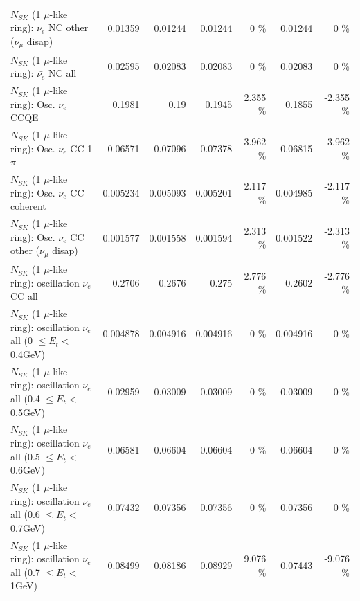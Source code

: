 \begin{table}
\begin{tabular}{| l | r | r | r  r | r  r |}
          $N_{SK}$ (1 $\mu$-like ring): $\bar{\nu_e}$ NC other ($\nu_\mu$ disap) &         0.01359 &         0.01244 &         0.01244 &        0 \%  &         0.01244 &        0 \%  \\ 
                            $N_{SK}$ (1 $\mu$-like ring): $\bar{\nu_{e}}$ NC all &         0.02595 &         0.02083 &         0.02083 &        0 \%  &         0.02083 &        0 \%  \\ 
\hline
\hline
\hline
                                 $N_{SK}$ (1 $\mu$-like ring): Osc. $\nu_e$ CCQE &          0.1981 &            0.19 &          0.1945 &    2.355 \%  &          0.1855 &   -2.355 \%  \\ 
                            $N_{SK}$ (1 $\mu$-like ring): Osc. $\nu_e$ CC 1$\pi$ &         0.06571 &         0.07096 &         0.07378 &    3.962 \%  &         0.06815 &   -3.962 \%  \\ 
                          $N_{SK}$ (1 $\mu$-like ring): Osc. $\nu_e$ CC coherent &        0.005234 &        0.005093 &        0.005201 &    2.117 \%  &        0.004985 &   -2.117 \%  \\ 
           $N_{SK}$ (1 $\mu$-like ring): Osc. $\nu_e$ CC other ($\nu_\mu$ disap) &        0.001577 &        0.001558 &        0.001594 &    2.313 \%  &        0.001522 &   -2.313 \%  \\ 
                        $N_{SK}$ (1 $\mu$-like ring): oscillation $\nu_e$ CC all &          0.2706 &          0.2676 &           0.275 &    2.776 \%  &          0.2602 &   -2.776 \%  \\ 
\hline
$N_{SK}$ (1 $\mu$-like ring): oscillation $\nu_{e}$ all (0 $\leq E_{t} <$ 0.4GeV) &        0.004878 &        0.004916 &        0.004916 &        0 \%  &        0.004916 &        0 \%  \\ 
$N_{SK}$ (1 $\mu$-like ring): oscillation $\nu_{e}$ all (0.4 $\leq E_{t} <$ 0.5GeV) &         0.02959 &         0.03009 &         0.03009 &        0 \%  &         0.03009 &        0 \%  \\ 
$N_{SK}$ (1 $\mu$-like ring): oscillation $\nu_{e}$ all (0.5 $\leq E_{t} <$ 0.6GeV) &         0.06581 &         0.06604 &         0.06604 &        0 \%  &         0.06604 &        0 \%  \\ 
$N_{SK}$ (1 $\mu$-like ring): oscillation $\nu_{e}$ all (0.6 $\leq E_{t} <$ 0.7GeV) &         0.07432 &         0.07356 &         0.07356 &        0 \%  &         0.07356 &        0 \%  \\ 
$N_{SK}$ (1 $\mu$-like ring): oscillation $\nu_{e}$ all (0.7 $\leq E_{t} <$ 1GeV) &         0.08499 &         0.08186 &         0.08929 &    9.076 \%  &         0.07443 &   -9.076 \%  \\ 

\end{tabular}
\end{table}
